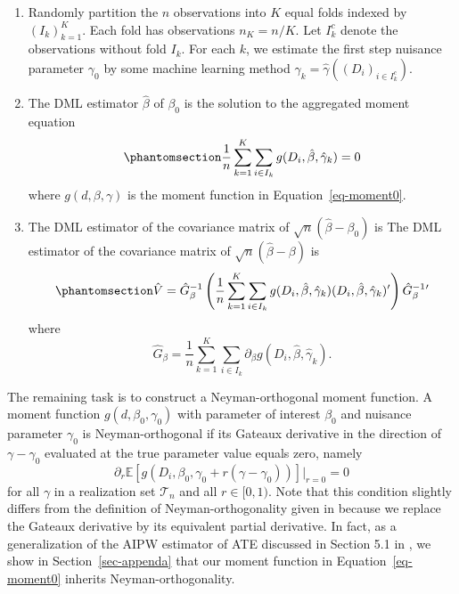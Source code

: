\documentclass[
  12pt,
  12pt]{article}
\numberwithin{equation}{section}
\theoremstyle{definition}
\theoremstyle{plain}
\theoremstyle{plain}
\theoremstyle{remark}
\begin{document}
\begin{enumerate}
\def\labelenumi{\arabic{enumi}.}
\item
  Randomly partition the \(n\) observations into \(K\) equal folds
  indexed by \((I_k)_{k = 1}^{K}\). Each fold has observations
  \(n_K = n/K\). Let \(I_k^c\) denote the observations without fold
  \(I_k\). For each \(k\), we estimate the first step nuisance parameter
  \(\gamma_0\) by some machine learning method
  \(\hat\gamma_k = \hat\gamma((D_i)_{i \in I_k^c})\).
\item
  The DML estimator \(\hat\beta\) of \(\beta_0\) is the solution to the
  aggregated moment equation
  \begin{equation}\phantomsection\label{eq-dmlestimator}{
  \frac1n \sum_{k = 1}^K \sum_{i \in I_k} g(D_i, \hat\beta, \hat\gamma_k) = 0
  }\end{equation} where \(g(d, \beta, \gamma)\) is the moment function
  in Equation~\ref{eq-moment0}.
\item
  The DML estimator of the covariance matrix of
  \(\sqrt{n}(\hat\beta - \beta_0)\) is The DML estimator of the
  covariance matrix of \(\sqrt{n}(\hat\beta - \beta)\) is
  \begin{equation}\phantomsection\label{eq-dmlvar}{
  \hat{V} = \hat{G}_\beta^{-1}\left(\frac1n\sum_{k = 1}^{K}\sum_{i \in I_k} g(D_i, \hat\beta, \hat\gamma_k)(D_i, \hat\beta, \hat\gamma_k)'\right)\hat{G}_\beta^{-1}{'}
  }\end{equation} where \[
  \hat{G}_\beta = \frac{1}{n}\sum_{k = 1}^{K}\sum_{i \in I_k} \partial_\beta g(D_i, \hat\beta, \hat\gamma_k).
  \]
\end{enumerate}

The remaining task is to construct a Neyman-orthogonal moment function.
A moment function \(g(d, \beta_0, \gamma_0)\) with parameter of interest
\(\beta_0\) and nuisance parameter \(\gamma_0\) is Neyman-orthogonal if
its Gateaux derivative in the direction of \(\gamma - \gamma_0\)
evaluated at the true parameter value equals zero, namely \[
\partial_r \mathbb{E}[g(D_i, \beta_0, \gamma_0 + r(\gamma - \gamma_0))]\vert_{r = 0} = 0
\] for all \(\gamma\) in a realization set \(\mathcal{T}_n\) and all
\(r \in [0, 1)\). Note that this condition slightly differs from the
definition of Neyman-orthogonality given in
\citet{chernozhukov2018double} because we replace the Gateaux derivative
by its equivalent partial derivative. In fact, as a generalization of
the AIPW estimator of ATE discussed in Section 5.1 in
\citet{chernozhukov2018double}, we show in Section~\ref{sec-appenda}
that our moment function in Equation~\ref{eq-moment0} inherits
Neyman-orthogonality.
\end{document}
